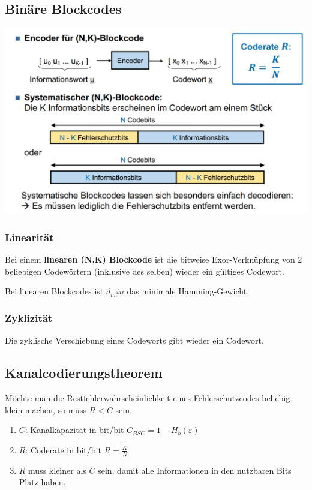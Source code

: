 \subsection{Binäre Blockcodes}%
\label{sub:binäre_blockcodes}

\begin{center}
    \includegraphics[width=1\linewidth]{images/blockc.png}
\end{center}

\subsubsection{Linearität}%
\label{ssub:linearität}

Bei einem \textbf{linearen (N,K) Blockcode} ist die bitweise Exor-Verknüpfung von 2 beliebigen Codewörtern (inklusive des selben) wieder ein gültiges Codewort.

Bei linearen Blockcodes ist $d_min$ das minimale Hamming-Gewicht.

\subsubsection{Zyklizität}%
\label{ssub:zyklizität}
Die zyklische Verschiebung eines Codeworts gibt wieder ein Codewort.

\subsection{Kanalcodierungstheorem}%
\label{sub:kanalcodierungstheorem}
Möchte man die Restfehlerwahrscheinlichkeit eines Fehlerschutzcodes beliebig klein machen, so muss $R < C$ sein.
\begin{enumerate}
    \item $C$: Kanalkapazität in bit/bit $C_{BSC}=1-H_b(\varepsilon)$
    \item $R$: Coderate in bit/bit $R=\frac{K}{N}$
    \item $R$ muss kleiner als $C$ sein, damit alle Informationen in den nutzbaren Bits Platz haben.
\end{enumerate}

